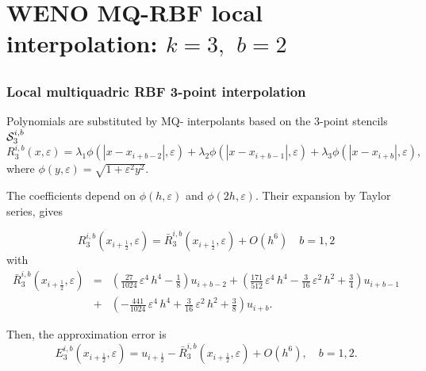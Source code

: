 \documentclass[xcolor=dvipsnames,9pt,mathserif]{beamer}
\newcommand\ep{\varepsilon^2}
\newcommand\uunmezzo{u_{i+\frac12}}
\newcommand\Rmqb{R^{i,b}}
\newcommand\Rmqbb{\bar{R}^{i,b}}
\newcommand\Emqb{E^{i,b}}
\newcommand\eps{{\varepsilon}}
\begin{document}
\section{WENO MQ-RBF local interpolation: $k=3,$ $b=2$}
\subsection{}
\begin{frame}\frametitle{Local multiquadric RBF 3-point interpolation}

Polynomials are substituted by   MQ-
interpolants  based on the 3-point stencils ${\cal
  S}_3^{i,b}$
$$
\Rmqb_3(x,\varepsilon)=\lambda_1 \phi(|x-x_{i+b-2}|,\varepsilon)
+ \lambda_2 \phi(|x-x_{i+b-1}|,\varepsilon)
+ \lambda_3 \phi(|x-x_{i+b}|,\varepsilon),
$$
where $\phi(y,\varepsilon)= \sqrt{1+\ep  y^2
 }.$

The coefficients depend on {$ \phi(h,\varepsilon)$ and $\phi(2h,\varepsilon).$ Their expansion by Taylor series, } gives

$$
\Rmqb_3(x_{i+\frac12},\varepsilon)=\Rmqbb_3(x_{i+\frac12},\varepsilon)
+ O(h^6)\quad b=1,2
$$
with
\begin{eqnarray*}
\Rmqbb_3(x_{i+\frac12},\varepsilon)
&=&\left(
\frac{27}{1024}\,{\eps}^4\,h^4-\frac{1}{8}
\right)u_{i+b-2}
+\left(
\frac{171}{512}\,{\eps}^4\,h^4-\frac{3}{16}\,{\eps}^2\,h^2+\frac{3}{4}
\right)u_{i+b-1}\\
&+&\left(
-\frac{441}{1024}\,{\eps}^4\,h^4+\frac{3}{16}\,{\eps}^2\,h^2+\frac{3}{8}
 \right)u_{i+b}.
\end{eqnarray*}

Then, the approximation error is
 $$\Emqb_3(x_{i+\frac12},\varepsilon)=\uunmezzo-\Rmqbb_3(x_{i+\frac12
},\varepsilon) + O( h^6), \quad b=1,2.$$

\end{frame}
\end{document}
